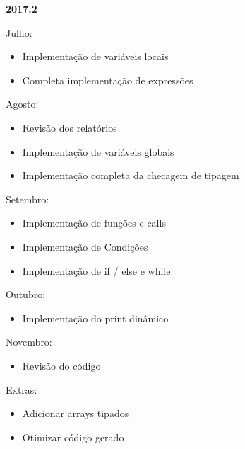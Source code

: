 \textbf{2017.2}

Julho:
\begin{itemize}
    \item Implementação de variáveis locais
    \item Completa implementação de expressões	
\end{itemize}

Agosto:
\begin{itemize}
    \item Revisão dos relatórios
    \item Implementação de variáveis globais
    \item Implementação completa da checagem de tipagem	
\end{itemize}

Setembro:
\begin{itemize}
    \item Implementação de funções e calls
    \item Implementação de Condições
    \item Implementação de if / else e while
\end{itemize}

Outubro:
\begin{itemize}
    \item Implementação do print dinâmico 
\end{itemize}

Novembro:
\begin{itemize}
    \item Revisão do código	
\end{itemize}

Extras:
\begin{itemize}
    \item Adicionar arrays tipados 
    \item Otimizar código gerado
\end{itemize}